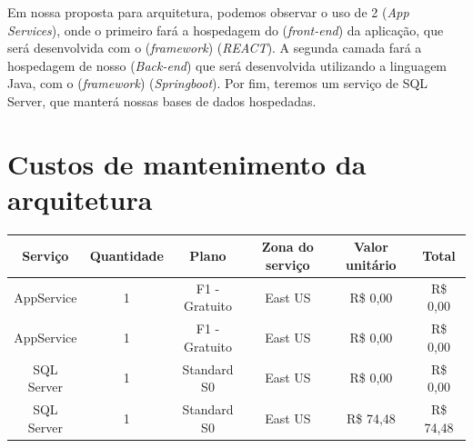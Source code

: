 \documentclass[
    12pt,               %
    openright,          %
    oneside,
    a4paper,            %
    MODELO,             %
    english,            %
    brazil              %
   ]{ifsp-spo-inf-ctds}
\begin{document}
Em nossa proposta para arquitetura, podemos observar o uso de 2 (\textit{App Services}), onde o primeiro fará a hospedagem do (\textit{front-end}) da aplicação, que será desenvolvida com o (\textit{framework}) (\textit{REACT}). A segunda camada fará a hospedagem de nosso (\textit{Back-end}) que será desenvolvida utilizando a linguagem Java, com o (\textit{framework}) (\textit{Springboot}).
Por fim, teremos um serviço de SQL Server, que manterá nossas bases de dados hospedadas.

\section{Custos de mantenimento da arquitetura}
\begin{table}[]
\vspace{-50mm}
\begin{tabular}{|c|c|c|c|c|c|}

\hline
\textbf{Serviço} & \textbf{Quantidade} & \textbf{Plano} & \textbf{Zona do serviço} & \textbf{Valor unitário} & \textbf{Total} \\ \hline
AppService & 1 & F1 - Gratuito & East US & R\$ 0,00 & R\$ 0,00 \\ \hline
AppService & 1 & F1 - Gratuito & East US & R\$ 0,00 & R\$ 0,00 \\ \hline
SQL Server & 1 & Standard S0 & East US & R\$ 0,00 & R\$ 0,00 \\ \hline
SQL Server & 1 & Standard S0 & East US & R\$ 74,48 & R\$ 74,48 \\ \hline
\end{tabular}
\end{table}





\end{document}
